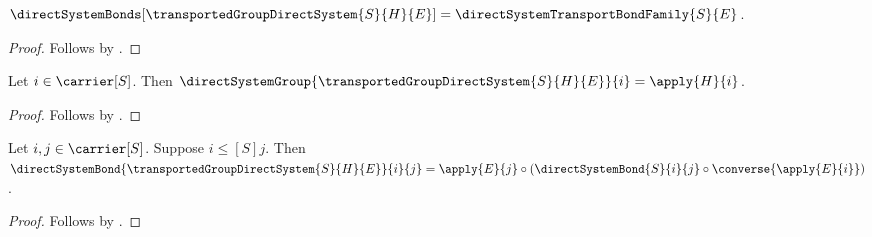 \begin{proposition}\label{transported_group_direct_system_bonds}
    $\directSystemBonds[\transportedGroupDirectSystem{S}{H}{E}]
        =\directSystemTransportBondFamily{S}{E}$.
\end{proposition}
\begin{proof}
    Follows by
        .
\end{proof}

\begin{proposition}\label{transported_group_direct_system_group}
    Let $i\in\carrier[S]$.
    Then $\directSystemGroup{\transportedGroupDirectSystem{S}{H}{E}}{i}
        =\apply{H}{i}$.
\end{proposition}
\begin{proof}
    Follows by
        .
\end{proof}

\begin{proposition}\label{transported_group_direct_system_bond}
    Let $i,j\in\carrier[S]$.
    Suppose $i\mathrel{\leq[S]}j$.
    Then $\directSystemBond
        {\transportedGroupDirectSystem{S}{H}{E}}{i}{j}
        =\apply{E}{j}\circ
            (\directSystemBond{S}{i}{j}\circ
                \converse{\apply{E}{i}})$.
\end{proposition}
\begin{proof}
    Follows by
        .
\end{proof}

